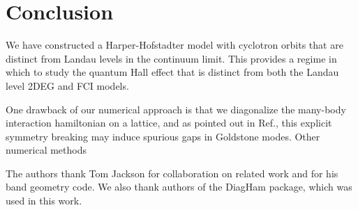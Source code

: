 \documentclass[aps,prb,twocolumn,letterpaper,twoside,nobalancelastpage,groupedaddress,amsmath,amssymb,floatfix,citeautoscript]{revtex4-1}
\begin{document}
\section{Conclusion}
We have constructed a Harper-Hofstadter model with cyclotron orbits that are distinct from Landau levels in the continuum limit. This provides a regime in which to study the quantum Hall effect that is distinct from both the Landau level 2DEG and FCI models. 

One drawback of our numerical approach is that we diagonalize the many-body interaction hamiltonian on a lattice, and as pointed out in Ref., this explicit symmetry breaking may induce spurious gaps in Goldstone modes. Other numerical methods 


\begin{acknowledgments}
The authors thank Tom Jackson for collaboration on related work and for his band geometry code. We also thank authors of the DiagHam package, which was used in this work.

\end{acknowledgments}


%

\clearpage

\end{document}
